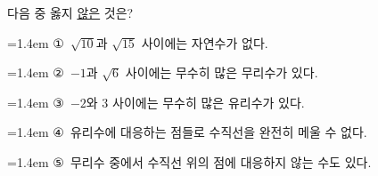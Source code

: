 다음 중 옳지 \underline{않은} 것은?
\par\medskip\par\noindent\hangindent=1.4em {\small ①}\ $\sqrt{10}$과 $\sqrt{15}$ 사이에는 자연수가 없다.\par\noindent\hangindent=1.4em {\small ②}\ $-1$과 $\sqrt{6}$ 사이에는 무수히 많은 무리수가 있다.\par\noindent\hangindent=1.4em {\small ③}\ $-2$와 $3$ 사이에는 무수히 많은 유리수가 있다.\par\noindent\hangindent=1.4em {\small ④}\ 유리수에 대응하는 점들로 수직선을 완전히 메울 수 없다.\par\noindent\hangindent=1.4em {\small ⑤}\ 무리수 중에서 수직선 위의 점에 대응하지 않는 수도 있다.\par\medskip
